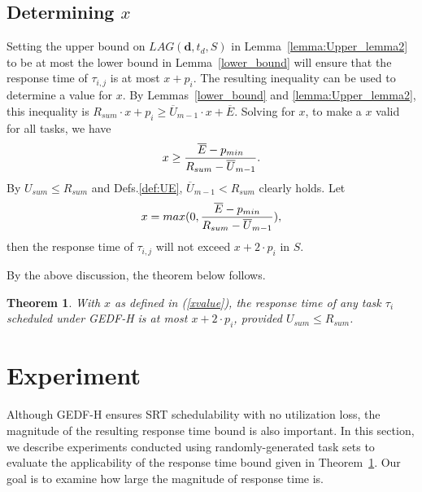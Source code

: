 \documentclass[Times, 10pt,twocolumn]{article}
\newtheorem{theorem}{\textbf{Theorem}}
\theoremstyle{definition}
\begin{document}
\subsection{Determining $x$}
\label{sec:x}

Setting the upper bound on $LAG(\textbf{d}, t_d, {S})$ in Lemma~\ref{lemma:Upper_lemma2} to be at most the lower bound in Lemma~\ref{lower_bound} will ensure that the response time of $\tau_{i,j}$ is at most $x + p_i $. The resulting inequality can be used to determine a value for $x$. By Lemmas~\ref{lower_bound} and \ref{lemma:Upper_lemma2}, this inequality is $R_{sum} \cdot x +p_i \geq \overline{U}_{m-1} \cdot x + \overline{E}$. Solving for $x$, to make a $x$ valid for all tasks, we have 
\begin{eqnarray}
\label{xrange}\vspace{-1mm}
 x \geq \dfrac{\overline{E}-p_{min}}{R_{sum}-\overline{U}_{m-1}}. 
\end{eqnarray} \vspace{-1mm}
By $U_{sum} \leq R_{sum}$ and Defs.\ref{def:UE}, $\overline{U}_{m-1} < R_{sum}$ clearly holds. Let
\begin{eqnarray}
\label{xvalue}\vspace{-1mm}
 x =max( 0 , \dfrac{\overline{E}-p_{min}}{R_{sum}-\overline{U}_{m-1}}) ,
\end{eqnarray} \vspace{-1mm} 
then the response time of $\tau_{i,j}$ will not exceed $x+2 \cdot p_i$ in ${S}$. 



By the above discussion, the theorem below follows.


\begin{theorem}
\label{theorem:SRTtest}
With $x$ as defined in (\ref{xvalue}), the response time of any task $\tau_i$ scheduled under GEDF-H is at most $x + 2 \cdot p_i $, provided $U_{sum} \leq R_{sum}$.
\end{theorem}






\section{Experiment}
\label{sec:Experiment}

Although GEDF-H ensures SRT schedulability with no utilization loss, the magnitude of the resulting response time bound is also important. In this section, we describe experiments conducted using randomly-generated task sets to evaluate the applicability of the response time bound given in Theorem~\ref{theorem:SRTtest}. Our goal is to examine how large the magnitude of response time is.
\end{document}

